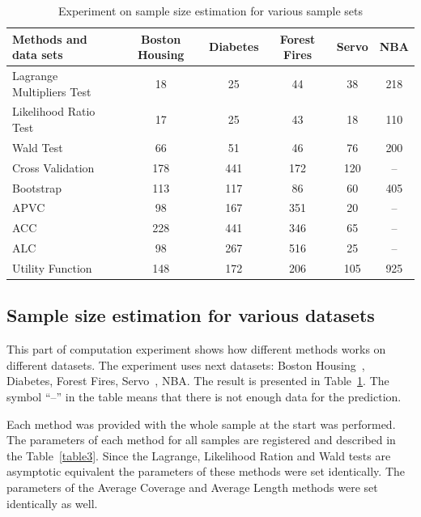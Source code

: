 \documentclass[
11pt,%
tightenlines,%
twoside,%
onecolumn,%
nofloats,%
nobibnotes,%
nofootinbib,%
superscriptaddress,%
noshowpacs,%
centertags]%
{revtex4}
\begin{document}
\begin{table}[!hbp]
\centering
\caption{Experiment on sample size estimation for various sample sets}
\label{table2}
\begin{tabular}{|l|c|c|c|c|c|}
\hline
 Methods and data sets                         & Boston Housing & Diabetes & Forest Fires & Servo & NBA \\ \hline\hline
Lagrange Multipliers Test & 18             & 25       & 44          & 38    & 218 \\ \hline
Likelihood Ratio Test     & 17             & 25       & 43          & 18    & 110 \\ \hline
Wald Test                 & 66             & 51       & 46          & 76    & 200 \\ \hline
Cross Validation          & 178            & 441      & 172         & 120   & --   \\ \hline
Bootstrap                 & 113            & 117      & 86          & 60    & 405 \\ \hline
APVC                      & 98             & 167      & 351         & 20    & --   \\ \hline
ACC                       & 228            & 441      & 346         & 65    & --   \\ \hline
ALC                       & 98             & 267      & 516         & 25    & --   \\ \hline
Utility Function          & 148            & 172      & 206         & 105   & 925 \\ \hline
\end{tabular}
\end{table}

\subsection{Sample size estimation for various datasets}
This part of computation experiment shows how different methods works on different datasets. The experiment uses next datasets: Boston Housing~\cite{boston}, Diabetes, Forest Fires, Servo~\cite{servo}, NBA.
The result is presented in Table~\ref{table2}. The symbol ``--'' in the table means that there is not enough data for the prediction.

Each method was provided with the whole sample at the start was performed. The parameters of each method for all samples are registered and described in the Table~\ref{table3}. Since the Lagrange, Likelihood Ration and Wald tests are asymptotic equivalent the parameters of these methods were set identically. The parameters of the Average Coverage and Average Length methods were set identically as well.
\end{document}
